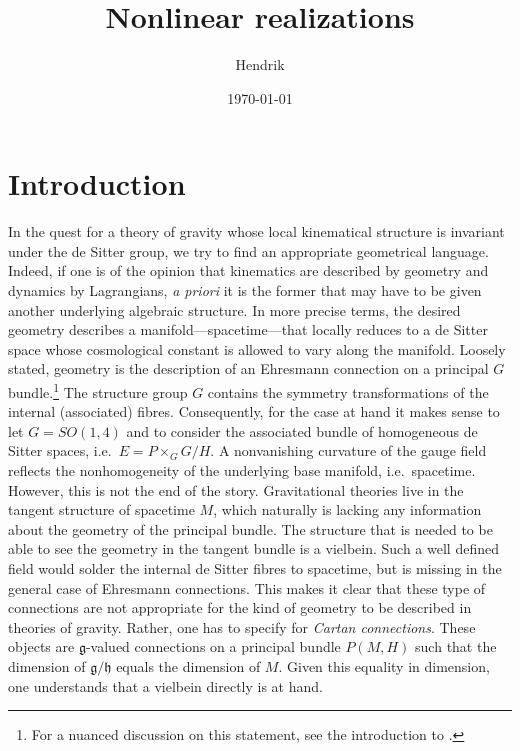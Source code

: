 \documentclass[11pt]{article}
\title{Nonlinear realizations}
\author{Hendrik}
\date{\today}
\begin{document}

\maketitle
\tableofcontents

\section{Introduction}

In the quest for a theory of gravity whose local kinematical 
structure is invariant under the de Sitter group, we try to find 
an appropriate geometrical language. Indeed, if one is of the 
opinion that kinematics are described by geometry and dynamics by 
Lagrangians, \emph{a priori} it is the former that may have to be 
given another underlying algebraic structure. In more precise 
terms, the desired geometry describes a 
manifold---spacetime---that locally reduces to a de Sitter space 
whose cosmological constant is allowed to vary along the 
manifold. Loosely stated, geometry is the description of an 
Ehresmann connection on a principal $G$ bundle.\footnote{For a 
	nuanced discussion on this statement, see the introduction to 
	\cite{sharpe1997diff_geo}.} The structure group $G$ contains 
the symmetry transformations of the internal (associated) fibres.  
Consequently, for the case at hand it makes sense to let $G = 
SO(1,4)$ and to consider the associated bundle of homogeneous de 
Sitter spaces, i.e.~$E = P \times_G G/H$.  A nonvanishing 
curvature of the gauge field reflects the nonhomogeneity of the 
underlying base manifold, i.e.~spacetime.  However, this is not 
the end of the story.  Gravitational theories live in the tangent 
structure of spacetime $M$, which naturally is lacking any 
information about the geometry of the principal bundle. The 
structure that is needed to be able to see the geometry in the 
tangent bundle is a vielbein.  Such a well defined field
would solder the internal de Sitter fibres to spacetime, but is 
missing in the general case of Ehresmann connections. This makes 
it clear that these type of connections are not appropriate for 
the kind of geometry to be described in theories of gravity.  
Rather, one has to specify for \emph{Cartan connections}. These 
objects are $\mathfrak{g}$-valued connections on a principal 
bundle $P(M,H)$ such that the dimension of 
$\mathfrak{g}/\mathfrak{h}$ equals the dimension of $M$.  Given 
this equality in dimension, one understands that a vielbein 
directly is at hand.
\end{document}
